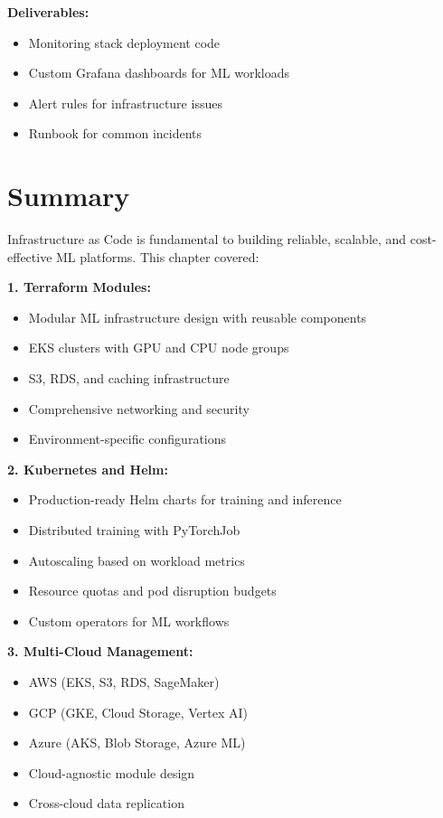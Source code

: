 \textbf{Deliverables:}
\begin{itemize}
    \item Monitoring stack deployment code
    \item Custom Grafana dashboards for ML workloads
    \item Alert rules for infrastructure issues
    \item Runbook for common incidents
\end{itemize}

\section{Summary}

Infrastructure as Code is fundamental to building reliable, scalable, and cost-effective ML platforms. This chapter covered:

\textbf{1. Terraform Modules:}
\begin{itemize}
    \item Modular ML infrastructure design with reusable components
    \item EKS clusters with GPU and CPU node groups
    \item S3, RDS, and caching infrastructure
    \item Comprehensive networking and security
    \item Environment-specific configurations
\end{itemize}

\textbf{2. Kubernetes and Helm:}
\begin{itemize}
    \item Production-ready Helm charts for training and inference
    \item Distributed training with PyTorchJob
    \item Autoscaling based on workload metrics
    \item Resource quotas and pod disruption budgets
    \item Custom operators for ML workflows
\end{itemize}

\textbf{3. Multi-Cloud Management:}
\begin{itemize}
    \item AWS (EKS, S3, RDS, SageMaker)
    \item GCP (GKE, Cloud Storage, Vertex AI)
    \item Azure (AKS, Blob Storage, Azure ML)
    \item Cloud-agnostic module design
    \item Cross-cloud data replication
\end{itemize}

